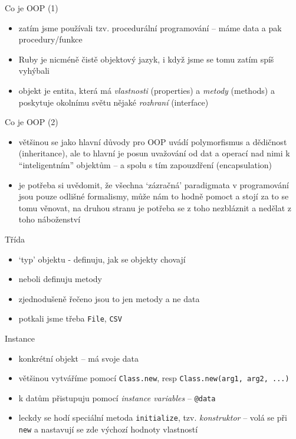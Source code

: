 \documentclass{beamer}
\begin{document}
\begin{frame}{Co je OOP (1)}
  \begin{itemize}
    \item zatím jsme používali tzv. procedurální programování – máme data a pak procedury/funkce
    \item Ruby je nicméně čistě objektový jazyk, i když jsme se tomu zatím spíš vyhýbali
    \item objekt je entita, která má \emph{vlastnosti} (properties) a \emph{metody} (methods) a poskytuje okolnímu světu nějaké \emph{rozhraní} (interface)
  \end{itemize}
\end{frame}

\begin{frame}{Co je OOP (2)}
  \begin{itemize}
    \item většinou se jako hlavní důvody pro OOP uvádí polymorfismus a dědičnost (inheritance), ale to hlavní je posun uvažování od dat a operací nad nimi k ``inteligentním'' objektům – a spolu s tím zapouzdření (encapsulation)
    \item je potřeba si uvědomit, že všechna `zázračná' paradigmata v programování jsou pouze odlišné formalismy, může nám to hodně pomoct a stojí za to se tomu věnovat, na druhou stranu je potřeba se z toho nezbláznit a nedělat z toho náboženství
  \end{itemize}
\end{frame}

\begin{frame}{Třída}
  \begin{itemize}
    \item `typ' objektu - definuju, jak se objekty chovají
    \item neboli definuju metody
    \item zjednodušeně řečeno jsou to jen metody a ne data
    \item potkali jsme třeba \texttt{File}, \texttt{CSV}
  \end{itemize}
\end{frame}

\begin{frame}[containsverbatim]{Instance}
  \begin{itemize}
    \item konkrétní objekt – má svoje data
    \item většinou vytváříme pomocí \texttt{Class.new}, resp \texttt{Class.new(arg1, arg2, ...)}
    \item k datům přistupuju pomocí \emph{instance variables} -- \verb|@data|
    \item leckdy se hodí speciální metoda \texttt{initialize}, tzv. \emph{konstruktor} -- volá se při \texttt{new} a nastavují se zde výchozí hodnoty vlastností
  \end{itemize}
\end{frame}
\end{document}
